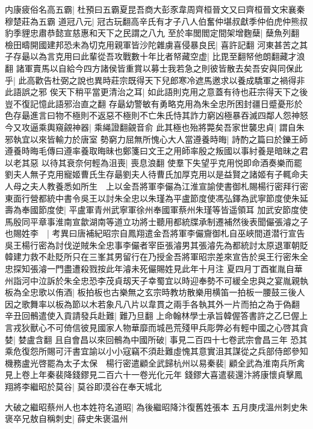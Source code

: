 内康疲俗名高五霸|{
	杜預曰五霸夏昆吾商大彭豕韋周齊桓晉文又曰齊桓晉文宋襄秦穆楚莊為五霸}
道冠八元|{
	冠古玩翻高辛氏有才子八人伯奮仲堪叔獻季仲伯虎仲熊叔豹季貍忠肅恭懿宣慈惠和天下之民謂之八九}
至於率閭閻定間架增麴蘖|{
	蘖魚列翻}
檢田疇開國建邦恐未為切克用親軍皆沙陀雜虜喜侵暴良民|{
	喜許記翻}
河東甚苦之其子存朂以為言克用曰此輩從吾攻戰數十年比者帑藏空虚|{
	比毘至翻帑他朗翻藏才浪翻}
諸軍賣馬以自給今四方諸侯皆重賞以募士我若急之則彼皆散去矣吾安與同保此乎|{
	此高歡告杜弼之說也異時莊宗既得天下兒郎寒冷遮馬邀求以養成驕軍之禍得非此語誤之邪}
俟天下稍平當更清治之耳|{
	如此語則克用之意蓋有待也莊宗得天下之後豈不復記憶此語邪治直之翻}
存朂幼警敏有勇略克用為朱全忠所困封疆日蹙憂形於色存朂進言曰物不極則不返惡不極則不亡朱氏恃其詐力窮凶極暴吞滅四鄰人怨神怒今又攻逼乘輿窺覦神器|{
	乘䋲證翻覦音俞}
此其極也殆將斃矣吾家世襲忠貞|{
	謂自朱邪執宜以來皆輸力於唐室}
勢窮力屈無所愧心大人當遵養時晦|{
	詩酌之篇曰於鑠王師遵養時晦毛傳曰遵率養取晦昧也鄭箋曰文王之用師率殷之叛國以事紂養是暗昧之君以老其惡}
以待其衰奈何輕為沮喪|{
	喪息浪翻}
使羣下失望乎克用悦即命酒奏樂而罷劉夫人無子克用寵姬曹氏生存朂劉夫人待曹氏加厚克用以是益賢之諸姬有子輒命夫人母之夫人教養悉如所生　上以金吾將軍李儼為江淮宣諭使書御札賜楊行密拜行密東面行營都統中書令吳王以討朱全忠以朱瑾為平盧節度使馮弘鐸為武寧節度使朱延壽為奉國節度使|{
	平盧軍青州武寧軍徐州奉國軍蔡州朱瑾等皆遥領耳}
加武安節度使馬殷同平章事淮南宣歙湖南等道立功將士聽用都統牒承制遷補然後表聞儼張濬之子也賜姓李　|{
	考異曰唐補紀昭宗自鳳翔遣金吾將軍李儼齎御札自巫峽間道潜行宣告吳王楊行密為討伐逆賊朱全忠事李儼者宰臣張濬男其張濬先為都統討太原退軍朝貶韓建力救不赴貶所只在三峯其男留行在乃授金吾將軍昭宗差來宣告於吳王行密朱全忠探知張濬一門盡遭殺戮按此年濬未死儼賜姓見此年十月注}
夏四月丁酉崔胤自華州詣河中泣訴於朱全忠恐李茂貞刼天子幸蜀宜以時迎奉勢不可緩全忠與之宴胤親執板為全忠歌以侑酒|{
	板拍板也古樂無之玄宗時教坊散樂用横笛一拍板一腰鼓三後人因之歌舞率以板為節以木若象凡八片以韋貫之兩手各執其外一片而拍之為于偽翻}
辛丑回鶻遣使入貢請發兵赴難|{
	難乃旦翻}
上命翰林學士承旨韓偓答書許之乙巳偓上言戎狄獸心不可倚信彼見國家人物華靡而城邑荒殘甲兵彫弊必有輕中國之心啓其貪婪|{
	婪盧含翻}
且自會昌以來回鶻為中國所破|{
	事見二百四十七卷武宗會昌三年}
恐其乘危復怨所賜可汗書宜諭以小小寇竊不須赴難虛愧其意實沮其謀從之兵部侍郎參知機務盧光啓罷為太子太保　楊行密遣顧全武歸杭州以易秦裴|{
	顧全武為淮南兵所禽見上卷上年秦裴降錢鏐見二百六十一卷光化元年}
錢鏐大喜遣裴還汴將康懷貞擊鳳翔將李繼昭於莫谷|{
	莫谷即漠谷在奉天城北}


大破之繼昭蔡州人也本姓符名道昭|{
	為後繼昭降汴復舊姓張本}
五月庚戌溫州刺史朱褒卒兄敖自稱刺史|{
	薛史朱褒温州}


